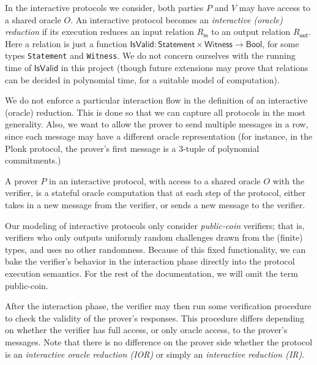 In the interactive protocols we consider, both parties $P$ and $V$ may have access to a shared oracle $O$. An interactive protocol becomes an \emph{interactive (oracle) reduction} if its execution reduces an input relation $R_{\mathsf{in}}$ to an output relation $R_{\mathsf{out}}$. Here a relation is just a function $\mathsf{IsValid}: \mathsf{Statement} \times \mathsf{Witness} \to \mathsf{Bool}$, for some types \verb|Statement| and \verb|Witness|. We do not concern ourselves with the running time of $\mathsf{IsValid}$ in this project (though future extensions may prove that relations can be decided in polynomial time, for a suitable model of computation).

\begin{remark}
    We do not enforce a particular interaction flow in the definition of an interactive (oracle) reduction. This is done so that we can capture all protocols in the most generality. Also, we want to allow the prover to send multiple messages in a row, since each message may have a different oracle representation (for instance, in the Plonk protocol, the prover's first message is a 3-tuple of polynomial commitments.)
\end{remark}

\begin{definition}
    \label{def:prover_type_signature}
    A prover $P$ in an interactive protocol, with access to a shared oracle $O$ with the verifier, is a stateful oracle computation that at each step of the protocol, either takes in a new message from the verifier, or sends a new message to the verifier.
\end{definition}

Our modeling of interactive protocols only consider \emph{public-coin} verifiers; that is, verifiers who only outputs uniformly random challenges drawn from the (finite) types, and uses no other randomness. Because of this fixed functionality, we can bake the verifier's behavior in the interaction phase directly into the protocol execution semantics. For the rest of the documentation, we will omit the term public-coin.

After the interaction phase, the verifier may then run some verification procedure to check the validity of the prover's responses. This procedure differs depending on whether the verifier has full access, or only oracle access, to the prover's messages. Note that there is no difference on the prover side whether the protocol is an \emph{interactive oracle reduction (IOR)} or simply an \emph{interactive reduction (IR)}.

